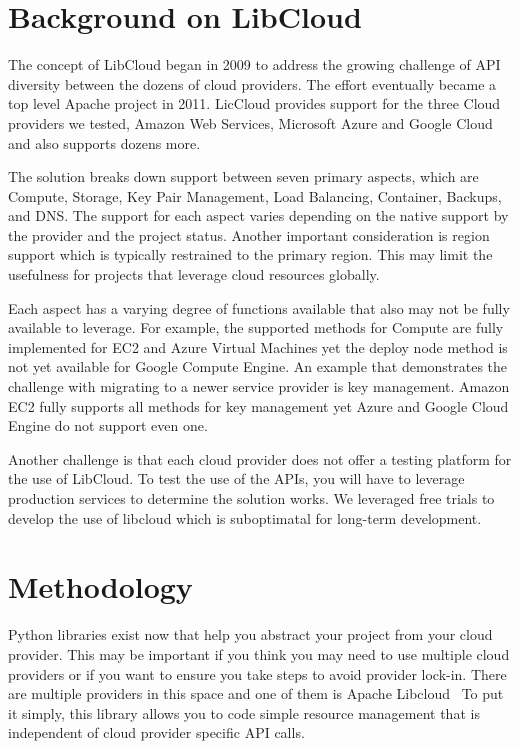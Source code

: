 \section{Background on LibCloud}

The concept of LibCloud began in 2009 to address the growing challenge of API diversity
between the dozens of cloud providers. The effort eventually became a top level Apache 
project in 2011. LicCloud provides support for the three Cloud providers we tested, 
Amazon Web Services, Microsoft Azure and Google Cloud and also supports dozens more.

The solution breaks down support between seven primary aspects, which are Compute, 
Storage, Key Pair Management, Load Balancing, Container, Backups, and DNS. The support
for each aspect varies depending on the native support by the provider and the project
status. Another important consideration is region support which is typically restrained
to the primary region. This may limit the usefulness for projects that leverage cloud
resources globally.

Each aspect has a varying degree of functions available that also may not be fully 
available to leverage. For example, the supported methods for Compute are fully 
implemented for EC2 and Azure Virtual Machines yet the deploy node method is not yet
available for Google Compute Engine. An example that demonstrates the challenge with
migrating to a newer service provider is key management. Amazon EC2 fully supports all 
methods for key management yet Azure and Google Cloud Engine do not support even one.

Another challenge is that each cloud provider does not offer a testing platform for the
use of LibCloud. To test the use of the APIs, you will have to leverage production 
services to determine the solution works. We leveraged free trials to develop the use 
of libcloud which is suboptimatal for long-term development.

\section{Methodology}

Python libraries exist now that help you abstract your project from  your cloud provider. 
This may be important if you think you may need to use multiple cloud providers or if you 
want to ensure you take steps to avoid provider lock-in. There are multiple providers in 
this space and one of them is Apache Libcloud~\cite{hid-sp18-518-LibCloud} To put it 
simply, this library allows you to code simple resource  management that is independent 
of cloud provider specific API calls.

